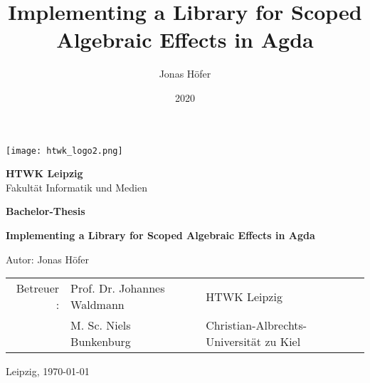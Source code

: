 \documentclass[10pt,a4paper,twoside,notitlepage]{report}
\title{Implementing a Library for Scoped Algebraic Effects in Agda}
\author{Jonas Höfer}
\date{2020}
\begin{document}
\begin{titlepage}
  \begin{large}
    \begin{center}

      \texttt{[image: htwk\_logo2.png]}

      \vskip 2cm

      \textbf{HTWK Leipzig}\\
      Fakultät Informatik und Medien\\

      \vskip 2cm

      \textbf{Bachelor-Thesis}

      \vskip 2cm

      \textbf{Implementing a Library for Scoped Algebraic Effects in Agda}\\

      \vfill

      Autor: Jonas Höfer\\

      \vskip 2cm

      \begin{tabular}{rll}
         Betreuer : & Prof. Dr. Johannes Waldmann & HTWK Leipzig\\
                    & M. Sc. Niels Bunkenburg     & Christian-Albrechts-Universität zu Kiel\\
      \end{tabular}

      \vskip 2cm

      Leipzig, \today\\

    \end{center}
  \end{large}
\end{titlepage}
\end{document}

